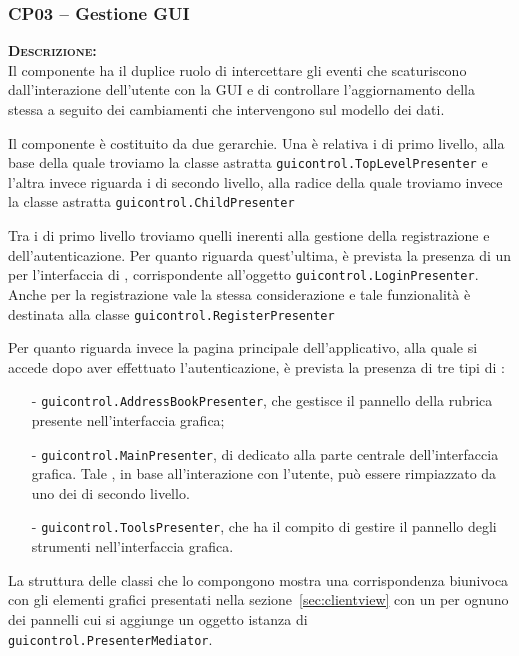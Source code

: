 \subsubsection{CP03 -- Gestione GUI}
\begin{description}
	\item{\scshape\bfseries Descrizione:}\\
Il componente ha il duplice ruolo di intercettare gli eventi che scaturiscono dall'interazione dell'utente con la GUI e di controllare l'aggiornamento della stessa a seguito dei cambiamenti che intervengono sul modello dei dati.

Il componente è costituito da due gerarchie. Una è relativa i  di primo livello, alla base della quale troviamo la classe astratta \texttt{guicontrol.TopLevelPresenter} e l'altra invece riguarda i di secondo livello, alla radice della quale troviamo invece la classe astratta \texttt{guicontrol.ChildPresenter}

Tra i  di primo livello troviamo quelli inerenti alla gestione della registrazione e dell'autenticazione.
Per quanto riguarda quest'ultima, è prevista la presenza di un  per l'interfaccia di , corrispondente all'oggetto \texttt{guicontrol.LoginPresenter}. Anche per la registrazione vale la stessa considerazione e tale funzionalità è destinata alla classe \texttt{guicontrol.RegisterPresenter}

Per quanto riguarda invece la pagina principale dell'applicativo, alla quale si accede dopo aver effettuato l'autenticazione, è prevista la presenza di tre tipi di :
\begin{itemize}[noitemsep,nolistsep]
  \item[-] \texttt{guicontrol.AddressBookPresenter}, che gestisce il pannello della rubrica presente nell'interfaccia grafica;
  \item[-] \texttt{guicontrol.MainPresenter},  di  dedicato alla parte centrale dell'interfaccia grafica. Tale , in base all'interazione con l'utente, può essere rimpiazzato da uno dei  di secondo livello.
  \item[-] \texttt{guicontrol.ToolsPresenter}, che ha il compito di gestire il pannello degli strumenti nell'interfaccia grafica.
\end{itemize}

La struttura delle classi che lo compongono mostra una corrispondenza biunivoca con gli elementi grafici presentati nella sezione~\ref{sec:clientview} con un  per ognuno dei pannelli cui si aggiunge un oggetto istanza di \texttt{guicontrol.PresenterMediator}.


\end{description}
